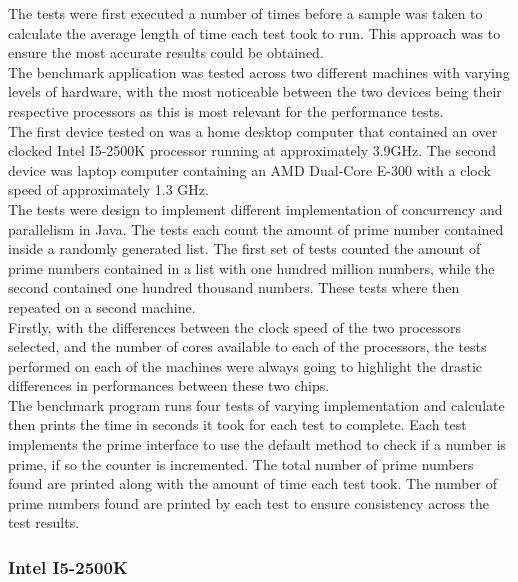 \documentclass[10pt]{article}  %
\theoremstyle{definition}
\theoremstyle{remark}
\begin{document}
The tests were first executed a number of times before a sample was taken to calculate the average length of time each test took to run. This approach was to ensure the most accurate results could be obtained. \\

The benchmark application was tested across two different machines with varying levels of hardware, with the most noticeable between the two devices being their respective processors as this is most relevant for the performance tests.\\

The first device tested on was a home desktop computer that contained an over clocked Intel I5-2500K processor running at approximately 3.9GHz. The second device was laptop computer containing an AMD Dual-Core E-300 with a clock speed of approximately 1.3 GHz.\\

The tests were design to implement different implementation of concurrency and parallelism in Java. The tests each count the amount of prime number contained inside a randomly generated list. The first set of tests counted the amount of prime numbers contained in a list with one hundred million numbers, while the second contained one hundred thousand numbers. These tests where then repeated on a second machine.\\

Firstly, with the differences between the clock speed of the two processors selected, and the number of cores available to each of the processors, the tests performed on each of the machines were always going to highlight the drastic differences in performances between these two chips.\\

The benchmark program runs four tests of varying implementation and calculate then prints the time in seconds it took for each test to complete.  Each test implements the prime interface to use the default method to check if a number is prime, if so the counter is incremented. The total number of prime numbers found are printed along with the amount of time each test took. The number of prime numbers found are printed by each test to ensure consistency across the test results.\\  

\subsubsection{Intel I5-2500K}
\end{document}

